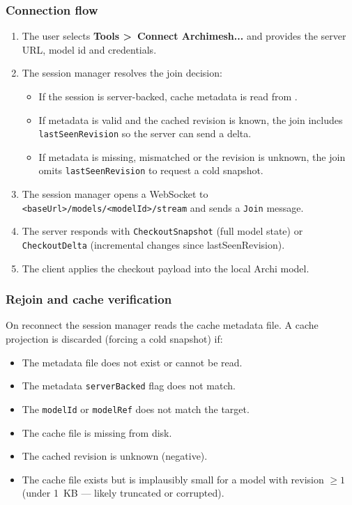 \subsubsection{Connection flow}

\begin{enumerate}
\item The user selects \textbf{Tools \textgreater\ Connect Archimesh...} and
  provides the server URL, model id and credentials.
\item The session manager resolves the join decision:
  \begin{itemize}
  \item If the session is server-backed, cache metadata is read from
    .
  \item If metadata is valid and the cached revision is known, the join
    includes \texttt{lastSeenRevision} so the server can send a delta.
  \item If metadata is missing, mismatched or the revision is unknown, the
    join omits \texttt{lastSeenRevision} to request a cold snapshot.
  \end{itemize}
\item The session manager opens a WebSocket to
  \texttt{<baseUrl>/models/<modelId>/stream} and sends a \texttt{Join} message.
\item The server responds with \texttt{CheckoutSnapshot} (full model state)
  or \texttt{CheckoutDelta} (incremental changes since lastSeenRevision).
\item The client applies the checkout payload into the local Archi model.
\end{enumerate}

\subsubsection{Rejoin and cache verification}

On reconnect the session manager reads the cache metadata file. A cache
projection is discarded (forcing a cold snapshot) if:

\begin{itemize}
\item The metadata file does not exist or cannot be read.
\item The metadata \texttt{serverBacked} flag does not match.
\item The \texttt{modelId} or \texttt{modelRef} does not match the target.
\item The cache file is missing from disk.
\item The cached revision is unknown (negative).
\item The cache file exists but is implausibly small for a model with
  revision \(\geq 1\) (under 1~KB --- likely truncated or corrupted).
\end{itemize}

